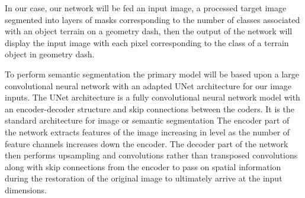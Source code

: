 \documentclass{article} %
\begin{document}
In our case, our network will be fed an input image, a processed target image segmented into layers of masks corresponding to the number of classes associated with an object terrain on a geometry dash, then the output of the network will display the input image with each pixel corresponding to the class of a terrain object in geometry dash. 

To perform semantic segmentation the primary model will be based upon a large convolutional neural network with an adapted UNet architecture for our image inputs. The UNet architecture is a fully convolutional neural network model with an encoder-decoder structure and skip connections between the coders. It is the standard architecture for image or semantic segmentation The encoder part of the network extracts features of the image increasing in level as the number of feature channels increases down the encoder. The decoder part of the network then performs upsampling and convolutions rather than transposed convolutions along with skip connections from the encoder to pass on spatial information during the restoration of the original image to ultimately arrive at the input dimensions. 



\label{last_page}



\end{document}
